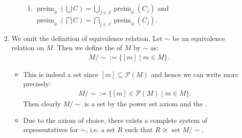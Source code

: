 \documentclass{article}
\begin{document}
\begin{enumerate}
\begin{itemize}
\begin{enumerate}
    \item $\operatorname{preim}_{\phi}(\bigcup C)=\bigcup_{j \in J} \operatorname{preim}_{\phi}\left(C_{j}\right)$ and $\operatorname{preim}_{\phi}(\bigcap C)=\bigcap_{j \in J} \operatorname{preim}_{\phi}\left(C_{j}\right)$.
\end{enumerate}
\end{itemize} 
\item {} We omit the definition of equivalence relation. Let $\sim$ be an equivalence relation on $M$. Then we define the  of $M$ by $\sim$ as:
\begin{align*}
M / \sim:=\{[m] \mid m \in M\} .
\end{align*}
\begin{itemize}
    \item This is indeed a set since $[m] \subseteq \mathcal{P}(M)$ and hence we can write more precisely:
\begin{align*}
M / \sim:=\{[m] \in \mathcal{P}(M) \mid m \in M\} .
\end{align*}
Then clearly $M / \sim$ is a set by the power set axiom and the .
\item  Due to the axiom of choice, there exists a complete system of representatives for $\sim$, i.e. a set $R$ such that $R \cong$ set $M / \sim$.
\end{itemize}


\end{enumerate}
\end{document}
